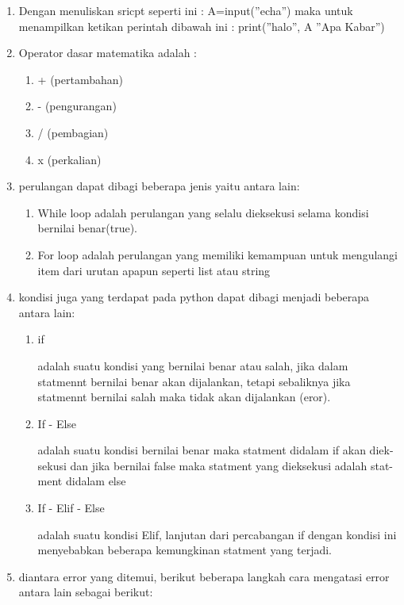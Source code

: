 \begin{enumerate}
	  \item Dengan menuliskan sricpt seperti ini :                         A=input(”echa”)
            maka untuk  menampilkan  ketikan  perintah  dibawah  ini :
            print(”halo”, A ”Apa Kabar”)
    \item Operator  dasar matematika adalah  :
    \begin{enumerate}
        \item  + (pertambahan)
        \item  - (pengurangan)
        \item   / (pembagian)
        \item  x (perkalian)
    \end{enumerate}
    \item perulangan dapat dibagi beberapa jenis yaitu antara lain:
    \begin{enumerate}
        \item While loop adalah perulangan  yang selalu dieksekusi selama kondisi bernilai benar(true).
        \item For loop adalah perulangan  yang memiliki kemampuan  untuk  mengulangi item dari urutan apapun  seperti list atau  string
    \end{enumerate}
    \item kondisi juga yang terdapat pada python dapat dibagi menjadi beberapa antara lain:
    \begin{enumerate}
        \item if
        \par adalah suatu kondisi yang bernilai benar atau  salah, jika dalam statmennt bernilai  benar  akan  dijalankan,  tetapi  sebaliknya  jika statmennt bernilai salah maka tidak  akan dijalankan  (eror).
        \item If - Else
        \par adalah  suatu  kondisi bernilai benar  maka statment didalam  if akan diek- sekusi dan jika bernilai false maka statment yang dieksekusi adalah  stat- ment didalam else
        \item If - Elif - Else
        \par adalah  suatu  kondisi Elif, lanjutan dari percabangan  if dengan kondisi ini menyebabkan  beberapa  kemungkinan  statment yang terjadi.
    \end{enumerate}
    \item diantara error yang ditemui, berikut beberapa langkah cara mengatasi error antara lain sebagai berikut:
    \begin{enumerate}

\end{enumerate}
\end{enumerate}
